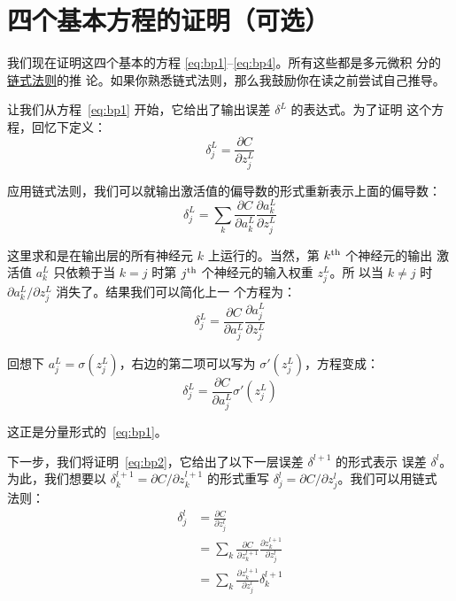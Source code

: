 \section{四个基本方程的证明（可选）}
\label{sec:proof_of_the_four_fundamental_equations}

我们现在证明这四个基本的方程 \eqref{eq:bp1}--\eqref{eq:bp4}。所有这些都是多元微积
分的\href{https://en.wikipedia.org/wiki/Chain_rule}{链式法则}的推
论。如果你熟悉链式法则，那么我鼓励你在读之前尝试自己推导。

让我们从方程~\eqref{eq:bp1} 开始，它给出了输出误差 $\delta^L$ 的表达式。为了证明
这个方程，回忆下定义：
\begin{equation}
  \delta^L_j = \frac{\partial C}{\partial z^L_j}
\label{eq:36}\tag{36}
\end{equation}

应用链式法则，我们可以就输出激活值的偏导数的形式重新表示上面的偏导数：
\begin{equation}
  \delta^L_j = \sum_k \frac{\partial C}{\partial a^L_k} \frac{\partial a^L_k}{\partial z^L_j}
\label{eq:37}\tag{37}
\end{equation}

这里求和是在输出层的所有神经元 $k$ 上运行的。当然，第 $k^{\rm th}$ 个神经元的输出
激活值 $a^L_k$ 只依赖于当 $k=j$ 时第 $j^{\rm th}$ 个神经元的输入权重 $z^L_j$。所
以当 $k \neq j$ 时 $\partial a^L_k / \partial z^L_j$ 消失了。结果我们可以简化上一
个方程为：
\begin{equation}
  \delta^L_j = \frac{\partial C}{\partial a^L_j} \frac{\partial a^L_j}{\partial z^L_j}
\label{eq:38}\tag{38}
\end{equation}

回想下 $a^L_j = \sigma(z^L_j)$，右边的第二项可以写为 $\sigma'(z^L_j)$，方程变成：
\begin{equation}
  \delta^L_j = \frac{\partial C}{\partial a^L_j} \sigma'(z^L_j)
\label{eq:39}\tag{39}
\end{equation}

这正是分量形式的~\eqref{eq:bp1}。

下一步，我们将证明~\eqref{eq:bp2}，它给出了以下一层误差 $\delta^{l+1}$ 的形式表示
误差 $\delta^l$。为此，我们想要以 $\delta^{l+1}_k = \partial C / \partial
z^{l+1}_k$ 的形式重写 $\delta^l_j = \partial C / \partial z^l_j$。我们可以用链式
法则：
\begin{align}
  \delta^l_j &= \frac{\partial C}{\partial z^l_j} \label{eq:40}\tag{40}\\
             &= \sum_k \frac{\partial C}{\partial z^{l+1}_k} \frac{\partial z^{l+1}_k}{\partial z^l_j} \label{eq:41}\tag{41}\\ 
             &= \sum_k \frac{\partial z^{l+1}_k}{\partial z^l_j} \delta^{l+1}_k \label{eq:42}\tag{42}
\end{align}

